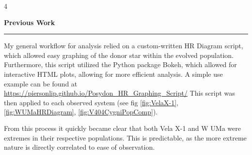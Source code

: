 \documentclass{article}
\begin{document}
\begin{multicols}{4}
\begin{tcolorbox}[sectionbox={Methods}, breakable=true]
  \textbf{Previous Work}
  \vspace{.5cm}
  \hrule
  \vspace{.5cm}
    My general workflow for analysis relied on a custom-written HR Diagram script, which allowed easy graphing of the donor star within the evolved population. Furthermore, this script utilized the Python package Bokeh, which allowed for interactive HTML plots, allowing for more efficient analysis. A simple use example can be found at \url{https://piersonlip.github.io/Posydon_HR_Graphing_Script/} This script was then applied to each observed system (see fig \ref{fig:VelaX-1}, \ref{fig:WUMaHRDiagram}, \ref{fig:V404CygniPopComp}).

    \begin{center}


      \label{fig:VelaX-1}
    \end{center}
    
    From this process it quickly became clear that both Vela X-1 and W UMa were extremes in their respective populations. This is predictable, as the more extreme nature is directly correlated to ease of observation.
  \vspace{.5cm}

    \begin{center}


      \label{fig:WUMaHRDiagram}
    \end{center}
    

\end{tcolorbox}
\end{multicols}
\end{document}
